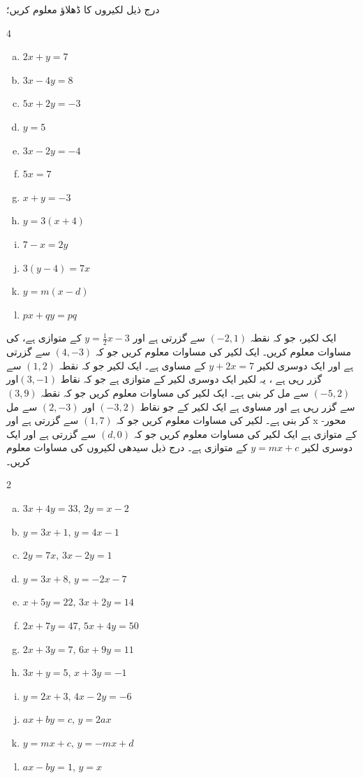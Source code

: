 درج ذیل لکیروں کا ڈھلاؤ معلوم کریں؛
\begin{multicols}{4}
\begin{enumerate}[a.]
\item \(2x+y=7 \)
\item \(3x-4y=8 \)
\item \(5x+2y=-3\)
\item \(y=5 \)
\item \(3x-2y =-4 \)
\item \(5x=7 \)
\item \(x+y=-3 \)
\item \(y=3(x+4) \)
\item \(7-x=2y \)
\item \(3(y-4) =7x \)
\item \(y=m(x-d) \)
\item \(px+qy=pq \)
\end{enumerate}
\end{multicols}
ایک لکیر، جو کہ نقطہ \( (-2,1) \) سے گزرتی ہے اور \( y=\frac{1}{2}x-3 \) کے متوازی ہے، کی مساوات معلوم کریں۔
ایک لکیر کی مساوات معلوم کریں جو کہ \((4,-3)\) سے گزرتی ہے اور ایک دوسری لکیر \( y+2x=7 \) کے مساوی ہے۔
ایک لکیر جو کہ نقطہ \((1,2)\) سے گزر رہی ہے ، یہ لکیر ایک دوسری لکیر کے متوازی ہے جو کہ نقاط \( (3,-1)\)اور \( (-5,2) \) سے مل کر بنی ہے۔
ایک لکیر کی مساوات معلوم کریں  جو  کہ نقطہ \(  (3,9) \) سے گزر رہی ہے اور مساوی ہے ایک لکیر کے جو نقاط \( (-3,2) \) اور \( (2, -3) \) سے مل کر بنی ہے۔
لکیر کی مساوات معلوم کریں جو کہ \( (1,7) \) سے گزرتی ہے اور  x -محور کے متوازی ہے
ایک لکیر کی مساوات معلوم کریں جو کہ \( (d,0) \) سے گزرتی ہے اور ایک دوسری لکیر \( y=mx+c \) کے متوازی ہے۔
درج ذیل سیدھی لکیروں کی مساوات معلوم کریں۔
\begin{multicols}{2}
\begin{enumerate}[a.]
\item \(3x+4y=33, \, 2y=x-2 \)
\item \(y=3x+1 , \, y=4x-1 \)
\item \(2y=7x, \, 3x-2y=1 \)
\item \(y=3x+8 , \, y=-2x-7 \)
\item \(x+5y=22 , \, 3x+2y=14 \)
\item \(2x+7y=47, \, 5x+4y=50 \)
\item \(2x+3y=7, \, 6x+9y =11 \)
\item \(3x+y=5, \, x+3y=-1 \)
\item \(y=2x+3, \, 4x-2y =-6 \)
\item \(ax+by=c, \, y=2ax \)
\item \(y=mx+c, \, y=-mx+d \)
\item \(ax-by=1, \, y=x \)
\end{enumerate}
 \end{multicols}
